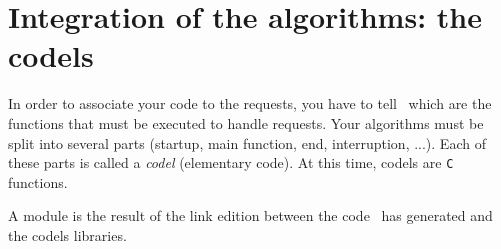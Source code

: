 
\section{Integration of the algorithms: the codels}
\label{sec|module|codels}

In order to associate your code to the requests, you have to tell \GenoM\
which are the  functions that must be  executed to  handle requests. Your
algorithms must be split into several parts (startup, main function, end,
interruption, ...).   Each  of  these   parts  is called  a   \emph{codel}
(elementary code). At this time, codels are \texttt{C} functions.

A module is the result of  the link edition between  the code \GenoM\ has
generated and the codels libraries.
